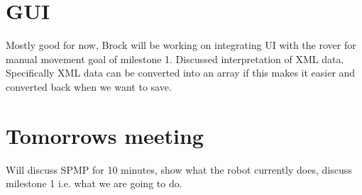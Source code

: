 \documentclass[11pt, a4paper]{article}
\begin{document}
\section{GUI}
	Mostly good for now, Brock will be working on integrating UI with the rover for manual movement goal of milestone 1. Discussed interpretation of XML data. Specifically XML data can be converted into an array if this makes it easier and converted back when we want to save.



\section{Tomorrows meeting}
	Will discuss SPMP for 10 minutes, show what the robot currently does, discuss milestone 1 i.e. what we are going to do.
	
\end{document}
